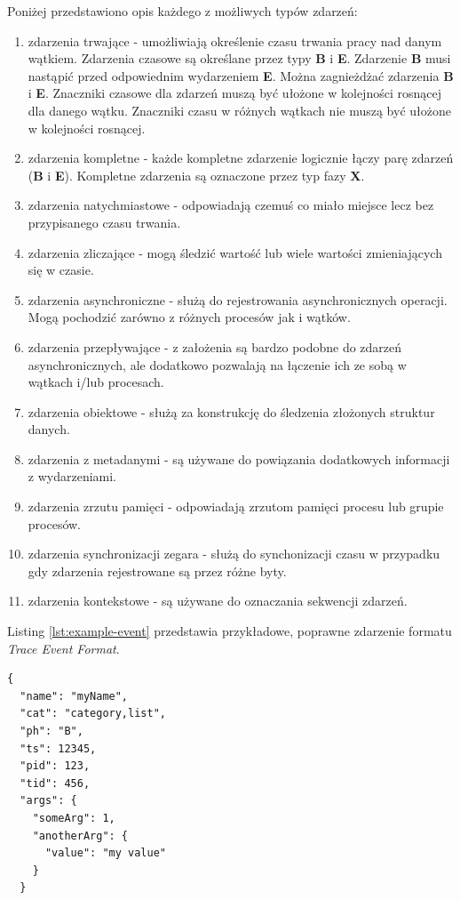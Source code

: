 \documentclass[polish, twoside, 12pt]{mwart}
\begin{document}
Poniżej przedstawiono opis każdego z możliwych typów zdarzeń:

\begin{enumerate}
  \item zdarzenia trwające - umożliwiają określenie czasu trwania pracy nad danym wątkiem. Zdarzenia czasowe są określane przez typy \textbf{B} i \textbf{E}. Zdarzenie \textbf{B} musi nastąpić przed odpowiednim wydarzeniem \textbf{E}. Można zagnieżdżać zdarzenia \textbf{B} i \textbf{E}. Znaczniki czasowe dla zdarzeń muszą być ułożone w kolejności rosnącej dla danego wątku. Znaczniki czasu w różnych wątkach nie muszą być ułożone w kolejności rosnącej.
  \item zdarzenia kompletne - każde kompletne zdarzenie logicznie łączy parę zdarzeń (\textbf{B} i \textbf{E}). Kompletne zdarzenia są oznaczone przez typ fazy \textbf{X}.
  \item zdarzenia natychmiastowe - odpowiadają czemuś co miało miejsce lecz bez przypisanego czasu trwania.
  \item zdarzenia zliczające - mogą śledzić wartość lub wiele wartości zmieniających się w czasie.
  \item zdarzenia asynchroniczne - służą do rejestrowania asynchronicznych operacji. Mogą pochodzić zarówno z różnych procesów jak i wątków.
  \item zdarzenia przepływające - z założenia są bardzo podobne do zdarzeń asynchronicznych, ale dodatkowo pozwalają na łączenie ich ze sobą w wątkach i/lub procesach.
  \item zdarzenia obiektowe - służą za konstrukcję do śledzenia złożonych struktur danych.
  \item zdarzenia z metadanymi - są używane do powiązania dodatkowych informacji z wydarzeniami.
  \item zdarzenia zrzutu pamięci - odpowiadają zrzutom pamięci procesu lub grupie procesów.
  \item zdarzenia synchronizacji zegara - służą do synchonizacji czasu w przypadku gdy zdarzenia rejestrowane są przez różne byty.
  \item zdarzenia kontekstowe - są używane do oznaczania sekwencji zdarzeń.
\end{enumerate}

Listing \ref{lst:example-event} przedstawia przykładowe, poprawne zdarzenie formatu \emph{Trace Event Format}.

\begin{lstlisting}[caption=Przykładowe zdarzenie, label={lst:example-event}]
{
  "name": "myName",
  "cat": "category,list",
  "ph": "B",
  "ts": 12345,
  "pid": 123,
  "tid": 456,
  "args": {
    "someArg": 1,
    "anotherArg": {
      "value": "my value"
    }
  }
\end{lstlisting}
\end{document}
